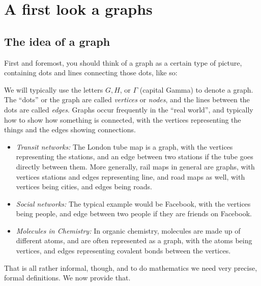 \documentclass[10pt,]{book}
\theoremstyle{plain}
\theoremstyle{definition}
\theoremstyle{definition}
\theoremstyle{definition}
\begin{document}
\section[{A first look a graphs}]{A first look a graphs}\label{s_intro_firstlook}
\typeout{************************************************}
\typeout{************************************************}
\subsection[{The idea of a graph}]{The idea of a graph}\label{subsection-1}
\hypertarget{p-3}{}%
First and foremost, you should think of a graph as a certain type of picture, containing dots and lines connecting those dots, like so:%
\par
\hypertarget{p-4}{}%
We will typically use the letters \(G, H\), or \(\Gamma\) (capital Gamma) to denote a graph.  The ``dots'' or the graph are called \emph{vertices} or \emph{nodes}, and the lines between the dots are called \emph{edges}. Graphs occur frequently in the ``real world'', and typically how to show how something is connected, with the vertices representing the things and the edges showing connections.  \leavevmode%
\begin{itemize}[label=\textbullet]
\item{}\emph{Transit networks:} The London tube map is a graph, with the vertices representing the stations, and an edge between two stations if the tube goes directly between them.  More generally, rail maps in general are graphs, with vertices stations and edges representing line, and road maps as well, with vertices being cities, and edges being roads.%
\item{}\emph{Social networks:} The typical example would be Facebook, with the vertices being people, and edge between two people if they are friends on Facebook.%
\item{}\emph{Molecules in Chemistry:} In organic chemistry, molecules are made up of different atoms, and are often represented as a graph, with the atoms being vertices, and edges representing covalent bonds between the vertices.%
\end{itemize}
%
\par
\hypertarget{p-5}{}%
That is all rather informal, though, and to do mathematics we need very precise, formal definitions.  We now provide that.%
\typeout{************************************************}
\typeout{************************************************}
\end{document}
